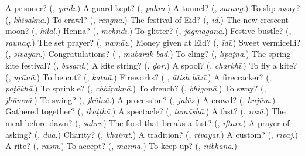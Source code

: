 \begin{tcolorbox}[breakable,colback=teal!4,colframe=teal!35!black,title={Before you move on}]
A prisoner? (\textbf{}, \emph{qaidī}.) A guard kept? (\textbf{}, \emph{pahrā}.) A tunnel? (\textbf{}, \emph{surang}.) To slip away? (\textbf{}, \emph{khisaknā}.) To crawl? (\textbf{}, \emph{rengnā}.) The festival of Eid? (\textbf{}, \emph{īd}.) The new crescent moon? (\textbf{}, \emph{hilāl}.) Henna? (\textbf{}, \emph{mehndī}.) To glitter? (\textbf{}, \emph{jagmagānā}.) Festive bustle? (\textbf{}, \emph{raunaq}.) The set prayer? (\textbf{}, \emph{namāz}.) Money given at Eid? (\textbf{}, \emph{īdī}.) Sweet vermicelli? (\textbf{}, \emph{sivayāṅ}.) Congratulations? (\textbf{ }, \emph{mubārak bād}.) To cling? (\textbf{}, \emph{lipaṭnā}.) The spring kite festival? (\textbf{}, \emph{basant}.) A kite string? (\textbf{}, \emph{ḍor}.) A spool? (\textbf{}, \emph{charkhī}.) To fly a kite? (\textbf{}, \emph{uṛānā}.) To be cut? (\textbf{}, \emph{kaṭnā}.) Fireworks? (\textbf{ }, \emph{ātish bāzī}.) A firecracker? (\textbf{}, \emph{paṭākhā}.) To sprinkle? (\textbf{}, \emph{chhiṛaknā}.) To drench? (\textbf{}, \emph{bhigonā}.) To sway? (\textbf{}, \emph{jhūmnā}.) To swing? (\textbf{}, \emph{jhūlnā}.) A procession? (\textbf{}, \emph{julūs}.) A crowd? (\textbf{}, \emph{hujūm}.) Gathered together? (\textbf{}, \emph{ikaṭṭhā}.) A spectacle? (\textbf{}, \emph{tamāshā}.) A fast? (\textbf{}, \emph{rozā}.) The meal before dawn? (\textbf{}, \emph{sahrī}.) The food that breaks a fast? (\textbf{}, \emph{iftārī}.) A prayer of asking? (\textbf{}, \emph{duā}.) Charity? (\textbf{}, \emph{khairāt}.) A tradition? (\textbf{}, \emph{rivāyat}.) A custom? (\textbf{}, \emph{rivāj}.) A rite? (\textbf{}, \emph{rasm}.) To accept? (\textbf{}, \emph{mānnā}.) To keep up? (\textbf{}, \emph{nibhānā}.)
\end{tcolorbox}
